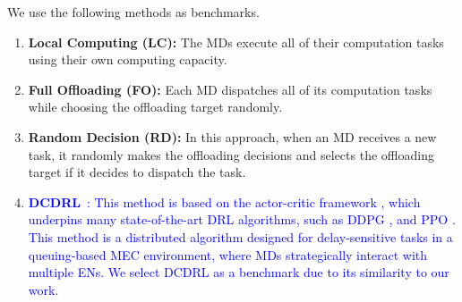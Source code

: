 \documentclass[10pt, journal,letterpaper]{IEEEtran}
\begin{document}
We use the following methods as benchmarks.
\begin{enumerate}

\item \textbf{Local Computing (LC):} The MDs execute all of their computation tasks using their own computing capacity.

\item \textbf{Full Offloading (FO):} Each MD dispatches all of its computation tasks while choosing the offloading target randomly. %

\item \textbf{Random Decision (RD):} In this approach, when an MD receives a new task, it randomly makes the offloading decisions and selects the offloading target if it decides to dispatch the task. %


\item \textcolor{blue}{\textbf{DCDRL}~\cite{qiu2020distributed}: This method is based on the actor-critic framework \cite{NIPS1999_6449f44a}, which underpins many state-of-the-art DRL algorithms, such as DDPG \cite{lillicrap2015continuous}, and PPO \cite{schulman2017proximal}. This method is a distributed algorithm designed for delay-sensitive tasks in a queuing-based MEC environment, where MDs strategically interact with multiple ENs. We select DCDRL as a benchmark due to its similarity to our work.}



	

\end{enumerate}



\end{document}
